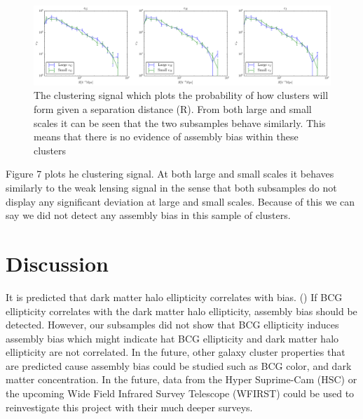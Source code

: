 \documentclass[iop]{emulateapj}
\begin{document}
	\begin{figure}[h] \label{fig:Cluster}
	\includegraphics[width = \linewidth]{SixSubSamplePlot_From_Zodiac_Combined}
		\caption{The clustering signal which plots the probability of how clusters will form given a separation distance (R). From both large and small scales it can be seen that the two subsamples behave similarly. This means that there is no evidence of assembly bias within these clusters}
	\end{figure}
Figure 7 plots he clustering signal. At both large and small scales it behaves similarly to the weak lensing signal in the sense that both subsamples do not display any significant deviation at large and small scales. Because of this we can say we did not detect any assembly bias in this sample of clusters.

\section{Discussion}
It is predicted that dark matter halo ellipticity correlates with bias. (\cite{2012JCAP...05..030S}) If BCG ellipticity correlates with the dark matter halo ellipticity, assembly bias should be detected. However, our subsamples did not show that BCG ellipticity induces assembly bias which might indicate hat BCG ellipticity and dark matter halo ellipticity are not correlated. In the future, other galaxy cluster properties that are predicted cause assembly bias could be studied such as BCG color, and dark matter concentration. In the future, data from the Hyper Suprime-Cam (HSC) or the upcoming Wide Field Infrared Survey Telescope (WFIRST) could be used to reinvestigate this project with their much deeper surveys.
\end{document}
